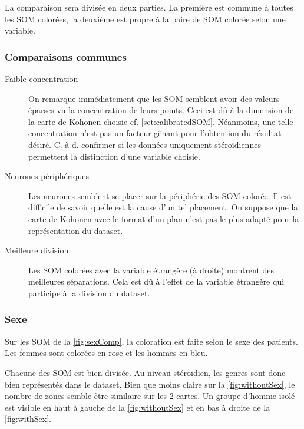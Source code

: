     La comparaison sera divisée en deux parties. La première est commune à toutes les SOM colorées, la deuxième est propre à la paire de SOM colorée selon une variable.

\subsubsection*{Comparaisons communes}

    \begin{description}

    \item[Faible concentration]
    On remarque immédiatement que les SOM semblent avoir des valeurs éparses vu la concentration de leurs points. Ceci est dû à la dimension de la carte de Kohonen choisie cf. \autoref{sct:calibratedSOM}. Néanmoins, une telle concentration n'est pas un facteur gênant pour l'obtention du résultat désiré. C.-à-d. confirmer si les données uniquement stéroïdiennes permettent la distinction d'une variable choisie.

    \item[Neurones périphériques]
    Les neurones semblent se placer sur la périphérie des SOM colorée. Il est difficile de savoir quelle est la cause d'un tel placement. On suppose que la carte de Kohonen avec le format d'un plan n'est pas le plus adapté pour la représentation du dataset.

    \item[Meilleure division]
    Les SOM colorées avec la variable étrangère (à droite) montrent des meilleures séparations. Cela est dû à l'effet de la variable étrangère qui participe à la division du dataset.

    \end{description}

\subsubsection*{Sexe}
    
    Sur les SOM de la \autoref{fig:sexComp}, la coloration est faite selon le sexe des patients. Les femmes sont colorées en rose et les hommes en bleu. 

    Chacune des SOM est bien divisée. Au niveau stéroïdien, les genres sont donc bien représentés dans le dataset. Bien que moins claire sur la \autoref{fig:withoutSex}, le nombre de zones semble être similaire sur les 2 cartes. Un groupe d'homme isolé est visible en haut à gauche de la \autoref{fig:withoutSex} et en bas à droite de la \autoref{fig:withSex}.

